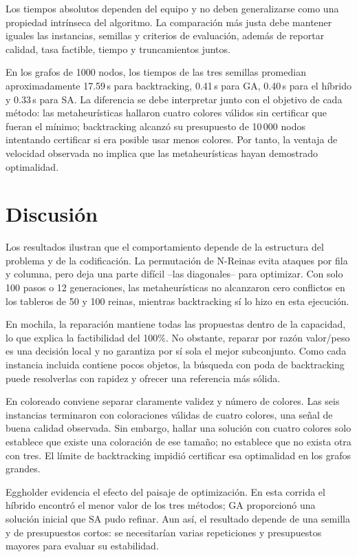 \documentclass[12pt,letterpaper]{article}
\begin{document}
Los tiempos absolutos dependen del equipo y no deben generalizarse como una
propiedad intrínseca del algoritmo. La comparación más justa debe mantener
iguales las instancias, semillas y criterios de evaluación, además de reportar
calidad, tasa factible, tiempo y truncamientos juntos.

En los grafos de 1000 nodos, los tiempos de las tres semillas promedian
aproximadamente 17.59\,s para backtracking, 0.41\,s para GA, 0.40\,s para el
híbrido y 0.33\,s para SA. La diferencia se debe interpretar junto con el
objetivo de cada método: las metaheurísticas hallaron cuatro colores válidos
sin certificar que fueran el mínimo; backtracking alcanzó su presupuesto de
10\,000 nodos intentando certificar si era posible usar menos colores. Por
tanto, la ventaja de velocidad observada no implica que las metaheurísticas
hayan demostrado optimalidad.

\section{Discusión}

Los resultados ilustran que el comportamiento depende de la estructura del
problema y de la codificación. La permutación de N-Reinas evita ataques por
fila y columna, pero deja una parte difícil --las diagonales-- para optimizar.
Con solo 100 pasos o 12 generaciones, las metaheurísticas no alcanzaron cero
conflictos en los tableros de 50 y 100 reinas, mientras backtracking sí lo
hizo en esta ejecución.

En mochila, la reparación mantiene todas las propuestas dentro de la
capacidad, lo que explica la factibilidad del 100\%. No obstante, reparar por
razón valor/peso es una decisión local y no garantiza por sí sola el mejor
subconjunto. Como cada instancia incluida contiene pocos objetos, la búsqueda
con poda de backtracking puede resolverlas con rapidez y ofrecer una
referencia más sólida.

En coloreado conviene separar claramente validez y número de colores. Las seis
instancias terminaron con coloraciones válidas de cuatro colores, una señal de
buena calidad observada. Sin embargo, hallar una solución con cuatro colores
solo establece que existe una coloración de ese tamaño; no establece que no
exista otra con tres. El límite de backtracking impidió certificar esa
optimalidad en los grafos grandes.

Eggholder evidencia el efecto del paisaje de optimización. En esta corrida el
híbrido encontró el menor valor de los tres métodos; GA proporcionó una
solución inicial que SA pudo refinar. Aun así, el resultado depende de una
semilla y de presupuestos cortos: se necesitarían varias repeticiones y
presupuestos mayores para evaluar su estabilidad.
\end{document}
